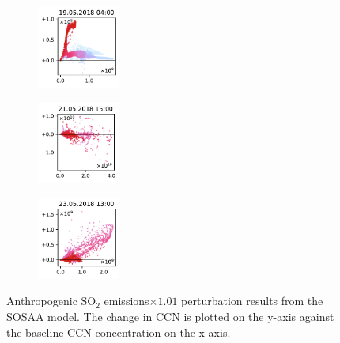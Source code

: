 \begin{figure}[H]
    \begin{subfigure}
        \centering
        \includegraphics[width=0.30\textwidth,valign=t]{evaluation/figures/perturbations/perturbation-19.05.2018:04.00-so2-mul-1.01.pdf}
    \end{subfigure}
    \begin{subfigure}
        \centering
        \includegraphics[width=0.30\textwidth,valign=t]{evaluation/figures/perturbations/perturbation-21.05.2018:15.00-so2-mul-1.01.pdf}
    \end{subfigure}
    \begin{subfigure}
        \centering
        \includegraphics[width=0.30\textwidth,valign=t]{evaluation/figures/perturbations/perturbation-23.05.2018:13.00-so2-mul-1.01.pdf}
    \end{subfigure}

    \caption[$\text{SO}_2$ emissions$\times 1.01$ perturbation SOSAA results]{Anthropogenic $\text{SO}_2$ emissions$\times 1.01$ perturbation results from the SOSAA model. The change in CCN is plotted on the y-axis against the baseline CCN concentration on the x-axis.}
    \label{fig:sosaa-perturbation-so2-mul-1.01}
\end{figure}

